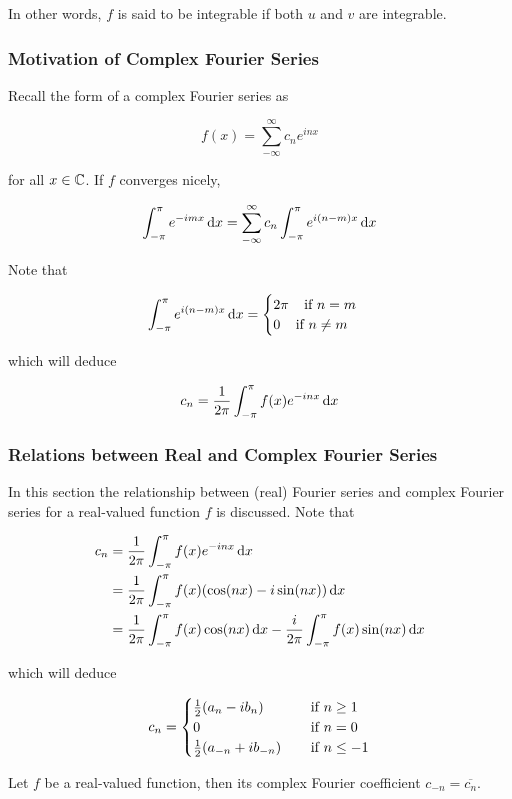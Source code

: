 \documentclass[a4paper,12pt]{article}
\begin{document}
In other words, $f$ is said to be integrable if both $u$ and $v$ are integrable.

\subsubsection{Motivation of Complex Fourier Series}
Recall the form of a complex Fourier series as

$$f(x)=\sum_{-\infty}^{\infty}c_{n}e^{inx}$$\s

for all $x\in\mathbb{C}$. If $f$ converges nicely,

$$\int_{-\pi}^{\pi}e^{-imx}\,\mathrm{d} x=\sum_{-\infty}^{\infty}c_{n}\int_{-\pi}^{\pi}e^{i(n-m)x}\,\mathrm{d} x$$\s

Note that

$$\int_{-\pi}^{\pi}e^{i(n-m)x}\,\mathrm{d} x=\begin{cases}
  2\pi\;\;\;\;\text{if }n=m\\
  0\;\;\;\;\text{if }n\neq m
\end{cases}$$\s

which will deduce

$$c_{n}=\frac{1}{2\pi}\int_{-\pi}^{\pi}f(x)e^{-inx}\,\mathrm{d} x$$

\subsubsection{Relations between Real and Complex Fourier Series}
In this section the relationship between (real) Fourier series and complex Fourier series for a real-valued function $f$ is discussed. Note that

$$\begin{aligned}[t]
  c_{n}&=\frac{1}{2\pi}\int_{-\pi}^{\pi}f(x)e^{-inx}\,\mathrm{d} x\\
  &=\frac{1}{2\pi}\int_{-\pi}^{\pi}f(x)(\cos(nx)-i\sin(nx))\,\mathrm{d} x\\
  &=\frac{1}{2\pi}\int_{-\pi}^{\pi}f(x)\cos(nx)\,\mathrm{d} x-\frac{i}{2\pi}\int_{-\pi}^{\pi}f(x)\sin(nx)\,\mathrm{d} x
\end{aligned}$$\s

which will deduce

$$c_{n}=\begin{cases}
  \frac{1}{2}(a_{n}-ib_{n})&\;\;\;\;\text{if }n\geq 1\\
  0&\;\;\;\;\text{if }n=0\\
  \frac{1}{2}(a_{-n}+ib_{-n})&\;\;\;\;\text{if }n\leq -1
\end{cases}$$\s

\begin{pst}
  Let $f$ be a real-valued function, then its complex Fourier coefficient $c_{-n}=\overline{c_{n}}$.
\end{pst}\n
\end{document}
